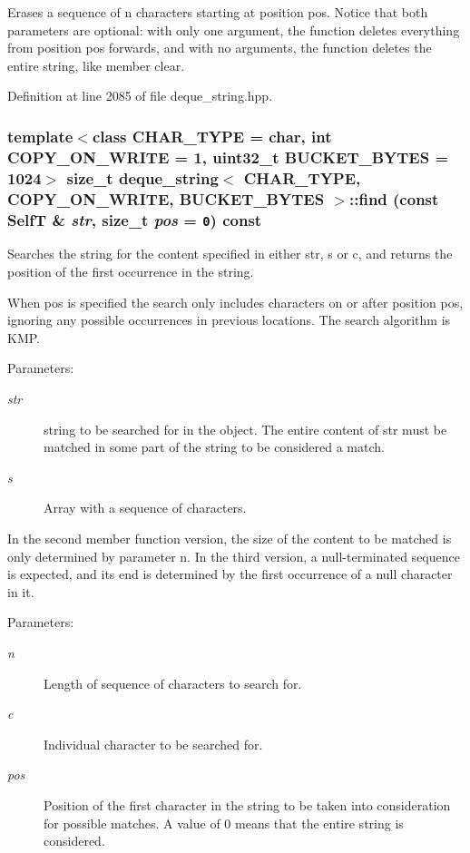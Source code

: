 Erases a sequence of n characters starting at position pos. Notice that both parameters are optional: with only one argument, the function deletes everything from position pos forwards, and with no arguments, the function deletes the entire string, like member clear. 

Definition at line 2085 of file deque\_\-string.hpp.\hypertarget{classdeque__string_2be9ae2c2547e5d4086aa7aabd1de547}{
\subsubsection[{find}]{\setlength{\rightskip}{0pt plus 5cm}template$<$class CHAR\_\-TYPE  = char, int COPY\_\-ON\_\-WRITE = 1, uint32\_\-t BUCKET\_\-BYTES = 1024$>$ size\_\-t {\bf deque\_\-string}$<$ CHAR\_\-TYPE, COPY\_\-ON\_\-WRITE, BUCKET\_\-BYTES $>$::find (const {\bf SelfT} \& {\em str}, \/  size\_\-t {\em pos} = {\tt 0}) const}}
\label{classdeque__string_2be9ae2c2547e5d4086aa7aabd1de547}


Searches the string for the content specified in either str, s or c, and returns the position of the first occurrence in the string.

When pos is specified the search only includes characters on or after position pos, ignoring any possible occurrences in previous locations. The search algorithm is KMP.

\begin{Desc}
\item[Parameters:]
\begin{description}
\item[{\em str}]string to be searched for in the object. The entire content of str must be matched in some part of the string to be considered a match. \item[{\em s}]Array with a sequence of characters.\end{description}
\end{Desc}
In the second member function version, the size of the content to be matched is only determined by parameter n. In the third version, a null-terminated sequence is expected, and its end is determined by the first occurrence of a null character in it.

\begin{Desc}
\item[Parameters:]
\begin{description}
\item[{\em n}]Length of sequence of characters to search for. \item[{\em c}]Individual character to be searched for. \item[{\em pos}]Position of the first character in the string to be taken into consideration for possible matches. A value of 0 means that the entire string is considered. \end{description}
\end{Desc}


